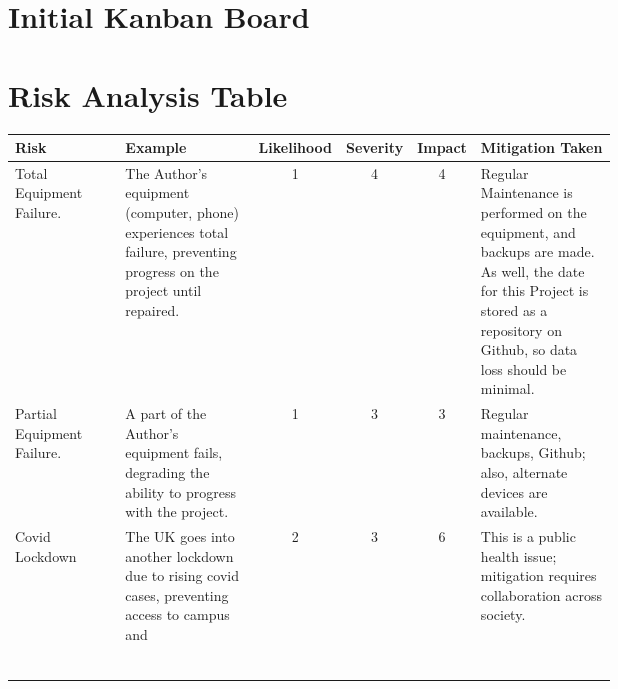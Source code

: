 \documentclass[11pt, a4paper, notitlepage]{report}
\begin{document}
\appendix
\chapter{Initial Kanban Board}\label{app:KanBan}
\chapter{Risk Analysis Table}\label{app:RiskAnalysis}
\begin{tabular}{|p{0.2\linewidth}|p{0.25\linewidth}|c|c|c|p{0.25\linewidth}|}
	\hline
	\small Risk & \small Example & \small Likelihood & \small Severity & \small 
	Impact 
	& \small Mitigation Taken \\
	\hline
	\small Total Equipment Failure. & \small The Author's equipment (computer, 
	phone) 
	experiences total failure, preventing progress on the project until 
	repaired. & 1 & 4 & 4 & \small Regular Maintenance is performed on the 
	equipment, and backups are made. As well, the date for this Project is 
	stored as a repository on Github, so data loss should be minimal. \\
	
	\small Partial Equipment Failure. & \small A part of the Author's equipment 
	fails, degrading the ability to progress with the project. & 1 & 3 & 3 & 
	\small Regular maintenance, backups, Github; also, alternate devices are 
	available. \\
	
	\small Covid Lockdown & The UK goes into another lockdown due to rising 
	covid cases, preventing access to campus and  & 2 & 3 & 6 & This is a 
	public health issue; mitigation requires collaboration across society.\\
	
	&  &  &  &  &  \\
	
	&  &  &  &  &  \\
	
	&  &  &  &  &  \\
	
	&  &  &  &  &  \\
	
	&  &  &  &  &  \\

	&  &  &  &  &  \\
	\hline
\end{tabular}

\end{document}
